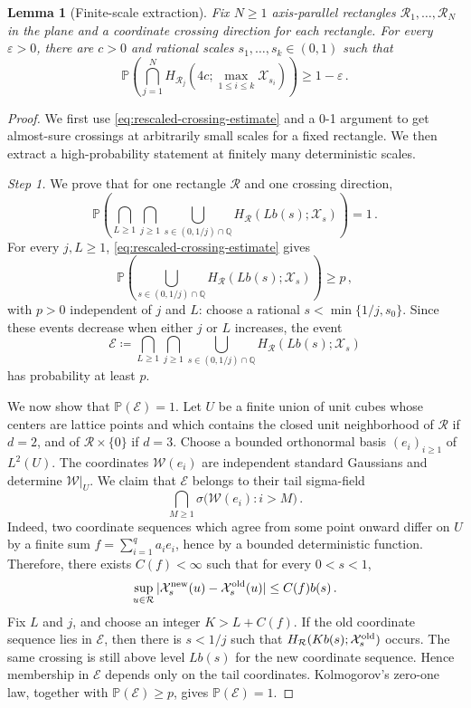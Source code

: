 \documentclass[11pt]{amsart}
\theoremstyle{plain}
\newtheorem{lemma}[theorem]{Lemma}
\theoremstyle{definition}
\renewcommand{\P}{\mathbb{P}}
\begin{document}
\begin{lemma}[Finite-scale extraction]\label{lem:finite-scale-extraction}
Fix $N\geq1$ axis-parallel rectangles $\mathcal R_1,\ldots,\mathcal R_N$ in the
plane and a coordinate crossing direction for each rectangle. For every
$\varepsilon>0$, there are $c>0$ and rational scales
$s_1,\ldots,s_k\in(0,1)$ such that
\[
    \P\left(
    \bigcap_{j=1}^N H_{\mathcal R_j}(4c;\max_{1\leq i\leq k}\mathcal X_{s_i})
    \right)\geq1-\varepsilon\, .
\]
\end{lemma}

\begin{proof}
We first use \eqref{eq:rescaled-crossing-estimate} and a 0-1 argument to get almost-sure crossings at arbitrarily small scales for a fixed rectangle. We then extract a high-probability statement at finitely many deterministic scales.


\emph{Step 1.}  We prove that for one rectangle $\mathcal R$ and one crossing
direction,
\[
    \P\left(
    \bigcap_{L\geq1}\bigcap_{j\geq1}
    \bigcup_{s\in(0,1/j)\cap\mathbb Q}
    H_{\mathcal R}(Lb(s);\mathcal X_s)
    \right)=1\, .
\]
For every $j,L\geq1$,
\eqref{eq:rescaled-crossing-estimate} gives
\[
    \P\left(
    \bigcup_{s\in(0,1/j)\cap\mathbb Q}
    H_{\mathcal R}(Lb(s);\mathcal X_s)
    \right)\geq p\, ,
\]
with $p>0$ independent of $j$ and $L$: choose a rational $s<\min\{1/j,s_0\}$. Since these events decrease when either $j$ or $L$
increases, the event
\[
    \mathcal E\coloneqq
    \bigcap_{L\geq1}\bigcap_{j\geq1}
    \bigcup_{s\in(0,1/j)\cap\mathbb Q}
    H_{\mathcal R}(Lb(s);\mathcal X_s)
\]
has probability at least $p$.

We now show that $\P(\mathcal E)=1$. Let $U$ be a finite union of unit cubes
whose centers are lattice points and which contains the closed unit neighborhood of
$\mathcal R$ if $d=2$, and of $\mathcal R\times\{0\}$ if $d=3$. Choose a bounded orthonormal basis $(e_i)_{i\geq1}$ of $L^2(U)$. The coordinates $\mathcal W(e_i)$ are
independent standard Gaussians and determine $\mathcal W|_U$. We claim that
$\mathcal E$ belongs to their tail sigma-field
\[
    \bigcap_{M\geq1}\sigma\bigl(\mathcal W(e_i):i>M\bigr)\, .
\]
Indeed, two coordinate sequences which agree from some point onward differ on $U$ by a finite sum $f=\sum_{i=1}^q a_i e_i$, hence by a bounded deterministic function. Therefore, there exists $C(f)<\infty$ such that for every $0<s<1$,
\[
    \sup_{u\in\mathcal R}|\mathcal X_s^{\rm new}(u)-\mathcal X_s^{\rm old}(u)|
    \leq C(f)b(s)\, .
\]
Fix $L$ and $j$, and choose an integer $K>L+C(f)$. If the old coordinate sequence lies in $\mathcal E$, then there is $s<1/j$ such that $H_{\mathcal R}(Kb(s);\mathcal X_s^{\rm old})$ occurs. The same crossing is still
above level $Lb(s)$ for the new coordinate sequence. Hence membership in
$\mathcal E$ depends only on the tail coordinates. Kolmogorov's zero-one law,
together with $\P(\mathcal E)\geq p$, gives $\P(\mathcal E)=1$.


\end{proof}
\end{document}
